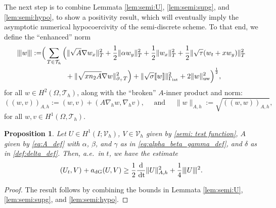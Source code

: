 \documentclass{amsart}
\newcommand{\norm}[2]{\|{#1}\|_{{#2}}}
\newcommand{\jump}[1]{[\kern-0.6mm [{#1}]\kern-0.6mm]}
\newcommand{\dee}{{\rm d}}
\newcommand{\Ahinner}[2]{(\!({#1},{#2})\!)_{A,h}}
\newcommand{\inner}[3]{({#1},{#2})_{{#3}}}
\newcommand{\Th}{\mathcal{T}_h}
\newcommand{\gint}{\Gamma_{\rm int}}
\newcommand{\ndg}[1]{|\kern-.03cm \|{#1}|\kern-.03cm \|}
\newcommand{\normal}{{n}}
\newcommand{\dt}{\,{\rm dt}}
\newtheorem{proposition}[theorem]{Proposition}
\theoremstyle{definition}
\theoremstyle{remark}
\numberwithin{equation}{section}
\begin{document}
The next step is to combine Lemmata \ref{lem:semi:U}, \ref{lem:semi:supg}, and \ref{lem:semi:hypo}, to show a positivity result, which will eventually imply the asymptotic numerical hypocoercivity of the semi-discrete scheme.
To that end, we define the ``enhanced'' norm
\begin{equation}\label{def: semi-discrete dG norm}
\begin{split}
\ndg{w}: =&\Big(
    \sum_{T \in \Th} \Big(
    \norm{\sqrt{A}\nabla w_x}{T}^2
  +
     \frac{1}{2}  \norm{\alpha w_y}{T}^2
+
  \frac{1}{2} \norm{w_x}{T}^2 +
  \frac{1}{2 } \norm{ \sqrt{\tau}(w_t + xw_y) }{T}^2\\
 &   \hspace{1.2cm}
+
\norm{ \sqrt{x\normal_2 A}\nabla w }{\partial_+ T}^2
\Big)
+ \norm{\sqrt{\sigma} \jump{w}}{\gint }^2+2\norm{w}{\rm uw}^2\Big)^{\frac{1}{2}},
\end{split}
\end{equation}
for all $w\in H^2(\Omega,\Th)$,
along with the ``broken'' $A$-inner product and norm:
\[
\Ahinner{w}{v}:= (w,v)+(A\nabla_h w,\nabla_h v), \quad\text{ and }\quad \norm{w}{A,h}:=\sqrt{\Ahinner{w}{w}},
\]
for all $w,v\in H^1(\Omega,\Th)$.
\begin{proposition}\label{stab_semi}
    Let $U \in H^1(I; {\mathcal{V}}_h)$, $V\in  {\mathcal{V}}_h$ given by \eqref{semi: test function}, $A$ given by \eqref{eq:A_def} with $\alpha$, $\beta$, and $\gamma$ as in \eqref{eq:alpha_beta_gamma_def}, and $\delta$ as in \eqref{def:delta_def}. Then, a.e.~in $t$, we have the estimate
    \begin{equation}
        \inner{U_t}{V}{}  +  a_{\rm dG}(U,V)
        \geq
        \frac{1}{2} \frac{\dee}{\dt}\norm{U}{A,h}^2+ \frac{1}{4}\ndg{U}^2.
    \end{equation}
\end{proposition}
\begin{proof}
	The result follows by combining the bounds in Lemmata \ref{lem:semi:U}, \ref{lem:semi:supg}, and \ref{lem:semi:hypo}.
\end{proof}
\end{document}
